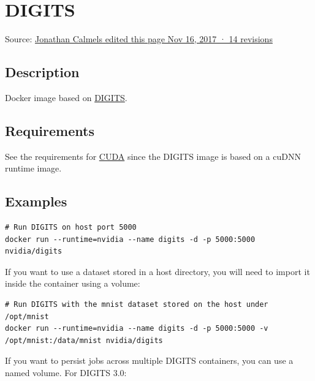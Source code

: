 %
%



\chapter{DIGITS}


{\tiny Source: \href{https://github.com/NVIDIA/nvidia-docker/wiki/DIGITS}{Jonathan Calmels edited this page Nov 16, 2017 ·  14 revisions}}


\section{Description}

Docker image based on \href{https://github.com/NVIDIA/DIGITS}{DIGITS}.

\section{Requirements}

See the requirements for \href{https://github.com/NVIDIA/nvidia-docker/wiki/CUDA#requirements}{CUDA} since the DIGITS image is based on a cuDNN runtime image.

\section{Examples}

\begin{lstlisting}
# Run DIGITS on host port 5000
docker run --runtime=nvidia --name digits -d -p 5000:5000 nvidia/digits
\end{lstlisting}

If you want to use a dataset stored in a host directory, you will need to import it inside the container using a volume:

\begin{lstlisting}
# Run DIGITS with the mnist dataset stored on the host under /opt/mnist
docker run --runtime=nvidia --name digits -d -p 5000:5000 -v /opt/mnist:/data/mnist nvidia/digits
\end{lstlisting}

If you want to persist jobs across multiple DIGITS containers, you can use a named volume. For DIGITS 3.0:

